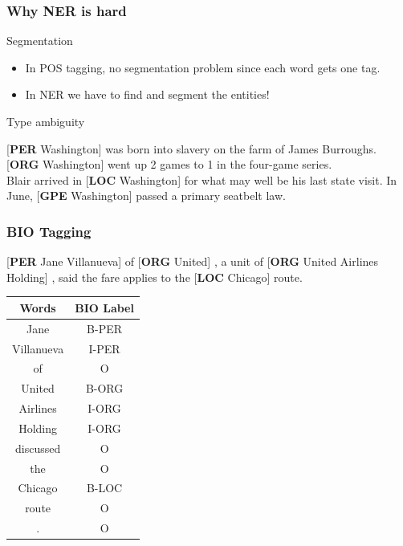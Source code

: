\documentclass[13.5pt,aspecratio=169]{beamer}
\begin{document}
    \begin{frame}
    \onehalfspacing
        \frametitle{Why NER is hard}	
        \begin{block}{Segmentation}
        \begin{itemize}
            \item In POS tagging, no segmentation problem since each word gets one tag.
                \item In NER we have to find and segment the entities!
        \end{itemize}
        \end{block}	
     \begin{block}{Type ambiguity}
         
    \color{blue} [\textbf{PER} Washington] \color{black} was born into slavery on the farm of James Burroughs. \color{blue}[\textbf{ORG} Washington] \color{black}went up 2 games to 1 in the four-game series. \\ 
    Blair arrived in \color{blue}[\textbf{LOC} Washington] \color{black} for what may well be his last state visit. In June, \color{blue}[\textbf{GPE} Washington] \color{black} passed a primary seatbelt law.
     \end{block}
    \end{frame}
    \begin{frame}
    \onehalfspacing
    
        \frametitle{BIO Tagging}	
        \color{blue}[\textbf{PER} Jane Villanueva] \color{black}of \color{blue}[\textbf{ORG} United]\color{black} , a unit of \color{blue}[\textbf{ORG} United Airlines Holding]\color{black} , said the fare applies to the \color{blue}[\textbf{LOC} Chicago]\color{black} route. 
    \begin{center}
    \renewcommand{\arraystretch}{0.83} %
        \begin{tabular}{ |c|c| } 
        \hline
        \large Words &  \large BIO Label\\ 
        \hline \small
        Jane & \small B-PER \\ \small
        Villanueva & \small I-PER \\ \small
        of & \small O \\ \small
        United & \small B-ORG \\ \small
        Airlines & I-ORG \\ \small
        Holding & I-ORG \\ \small
        discussed & O \\ \small
        the & \small O \\ \small
        Chicago & \small B-LOC \\ \small
        route & \small O \\ \small
        . & \small O \\ 
    \hline
    \end{tabular}
    \end{center}
    \end{frame}
\end{document}
